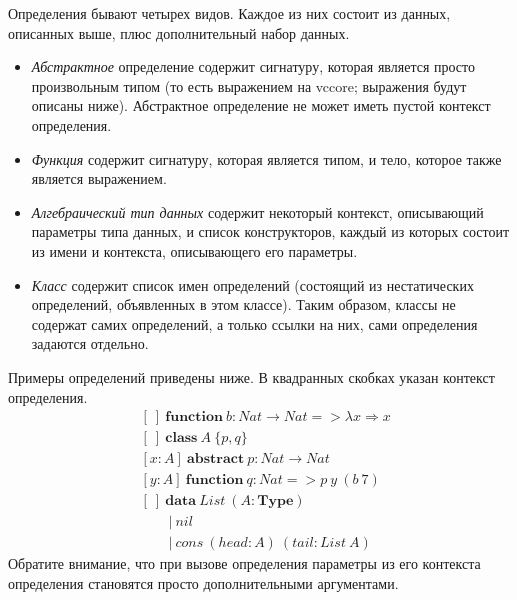 \documentclass{amsart}
\theoremstyle{definition}
\theoremstyle{remark}
\numberwithin{figure}{section}
\begin{document}
Определения бывают четырех видов.
Каждое из них состоит из данных, описанных выше, плюс дополнительный набор данных.
\begin{itemize}
\item \emph{Абстрактное} определение содержит сигнатуру, которая является просто произвольным типом (то есть выражением на vccore; выражения будут описаны ниже). Абстрактное определение не может иметь пустой контекст определения.
\item \emph{Функция} содержит сигнатуру, которая является типом, и тело, которое также является выражением.
\item \emph{Алгебраический тип данных} содержит некоторый контекст, описывающий параметры типа данных, и список конструкторов, каждый из которых состоит из имени и контекста, описывающего его параметры.
\item \emph{Класс} содержит список имен определений (состоящий из нестатических определений, объявленных в этом классе). Таким образом, классы не содержат самих определений, а только ссылки на них, сами определения задаются отдельно.
\end{itemize}

Примеры определений приведены ниже. В квадранных скобках указан контекст определения.
\begin{align*}
& [\ ]\ \mathbf{function}\ b : Nat \to Nat => \lambda x \Rightarrow x \\
& [\ ]\ \mathbf{class}\ A\ \{ p, q \} \\
& [x : A]\ \mathbf{abstract}\ p : Nat \to Nat \\
& [y : A]\ \mathbf{function}\ q : Nat => p\ y\ (b\ 7) \\
& [\ ]\ \mathbf{data}\ List\ (A : \mathbf{Type}) \\
& \qquad |\ nil \\
& \qquad |\ cons\ (head : A)\ (tail : List\ A)
\end{align*}
Обратите внимание, что при вызове определения параметры из его контекста определения становятся просто дополнительными аргументами.



\end{document}

